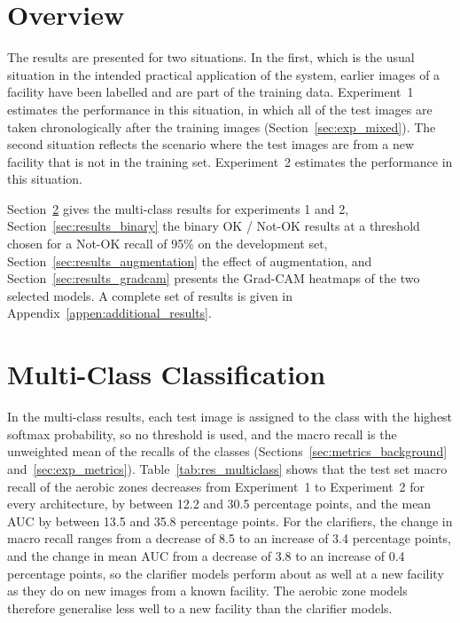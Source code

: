 \label{chap:results}

\section{Overview}
\label{sec:results_overview}

The results are presented for two situations. In the first, which is the usual situation in the intended practical application of the system, earlier images of a facility have been labelled and are part of the training data. Experiment~1 estimates the performance in this situation, in which all of the test images are taken chronologically after the training images (Section~\ref{sec:exp_mixed}). The second situation reflects the scenario where the test images are from a new facility that is not in the training set. Experiment~2 estimates the performance in this situation.

Section~\ref{sec:results_multiclass} gives the multi-class results for experiments 1 and 2, Section~\ref{sec:results_binary} the binary OK / Not-OK results at a threshold chosen for a Not-OK recall of 95\% on the development set, Section~\ref{sec:results_augmentation} the effect of augmentation, and Section~\ref{sec:results_gradcam} presents the Grad-CAM heatmaps of the two selected models. A complete set of results is given in Appendix~\ref{appen:additional_results}. 


\section{Multi-Class Classification}
\label{sec:results_multiclass}

In the multi-class results, each test image is assigned to the class with the highest softmax probability, so no threshold is used, and the macro recall is the unweighted mean of the recalls of the classes (Sections~\ref{sec:metrics_background} and~\ref{sec:exp_metrics}). Table~\ref{tab:res_multiclass} shows that the test set macro recall of the aerobic zones decreases from Experiment~1 to Experiment~2 for every architecture, by between 12.2 and 30.5 percentage points, and the mean AUC by between 13.5 and 35.8 percentage points. For the clarifiers, the change in macro recall ranges from a decrease of 8.5 to an increase of 3.4 percentage points, and the change in mean AUC from a decrease of 3.8 to an increase of 0.4 percentage points, so the clarifier models perform about as well at a new facility as they do on new images from a known facility. The aerobic zone models therefore generalise less well to a new facility than the clarifier models. 

